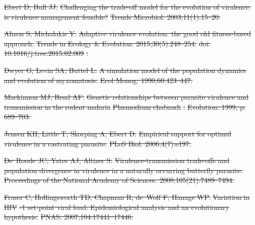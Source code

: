 \documentclass[10pt,letterpaper]{article}
\providecommand{\DIFdeltex}[1]{{\protect\color{red}\sout{#1}}}                      %
\providecommand{\DIFdel}[1]{\texorpdfstring{\DIFdeltex{#1}}{}} %
\begin{document}
\DIFdel{Ebert D, Bull JJ.
}%
\DIFdel{Challenging the trade-off model for the evolution of virulence: is
  virulence management feasible?
}%
\DIFdel{Trends Microbiol. 2003;11(1):15--20.
}%

\DIFdel{Alizon S, Michalakis Y.
}%
\DIFdel{Adaptive virulence evolution: the good old fitness-based approach.
}%
\DIFdel{Trends in Ecology \& Evolution. 2015;30(5):248--254.
}%
\DIFdel{doi:}%
\DIFdel{10.1016/j.tree.2015.02.009}%
\DIFdel{.
}%

\DIFdel{Dwyer G, Levin SA, Buttel L.
}%
\DIFdel{A simulation model of the population dynamics and evolution of
  myxomatosis.
}%
\DIFdel{Ecol Monog. 1990;60:423--447.
}%

\DIFdel{Mackinnon MJ, Read AF.
}%
\DIFdel{Genetic relationships between parasite virulence and transmission in
  the rodent malaria }%
\DIFdel{Plasmodium chabaudi}%
\DIFdel{.
}%
\DIFdel{Evolution. 1999; p. 689--703.
}%

\DIFdel{Jensen KH, Little T, Skorping A, Ebert D.
}%
\DIFdel{Empirical support for optimal virulence in a castrating parasite.
}%
\DIFdel{PLoS Biol. 2006;4(7):e197.
}%

\DIFdel{De~Roode JC, Yates AJ, Altizer S.
}%
\DIFdel{Virulence-transmission trade-offs and population divergence in
  virulence in a naturally occurring butterfly parasite.
}%
\DIFdel{Proceedings of the National Academy of Sciences.
  2008;105(21):7489--7494.
}%

\DIFdel{Fraser C, Hollingsworth TD, Chapman R, de~Wolf F, Hanage WP.
}%
\DIFdel{Variation in }%
\DIFdel{HIV}%
\DIFdel{-1 set-point viral load: Epidemiological analysis
  and an evolutionary hypothesis.
}%
\DIFdel{PNAS. 2007;104:17441--17446.
}%
\end{document}
